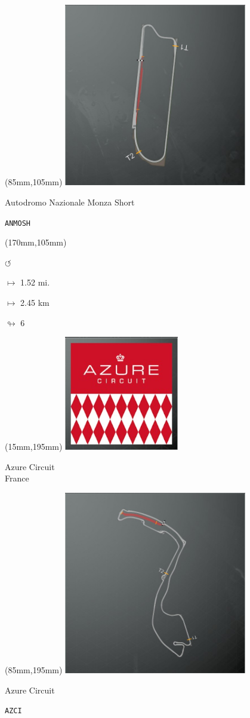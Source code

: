 \begin{textblock*}{80mm}(85mm,105mm)%
\includegraphics[width=80mm]{TR/2015-05-20_00035.png}
\centerline{Autodromo Nazionale Monza Short}
\par\hfill\tiny\tt ANMOSH\\
\end{textblock*}
\begin{textblock*}{30mm}(170mm,105mm)%
\par \Huge$\circlearrowleft$
\Large
\par$\mapsto$ 1.52 mi.
\par$\mapsto$ 2.45 km
\par$\looparrowright$ 6
\end{textblock*}
\begin{textblock*}{60mm}(15mm,195mm)%
\includegraphics[width=50mm]{LG/2015-05-20_00072.png}
\par Azure Circuit\\ France
\end{textblock*}
\begin{textblock*}{80mm}(85mm,195mm)%
\includegraphics[width=80mm]{TR/2015-05-20_00001.png}
\centerline{Azure Circuit}
\par\hfill\tiny\tt AZCI\\
\end{textblock*}
